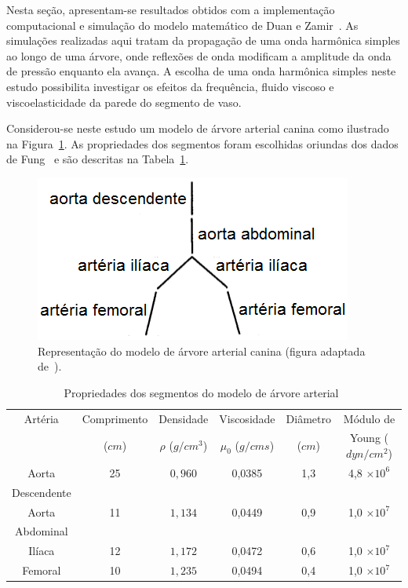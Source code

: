 \documentclass[a4paper,12pt]{monografia}
\theoremstyle{plain}
\theoremstyle{definition}
\theoremstyle{remark}
\begin{document}
Nesta seção, apresentam-se resultados obtidos com a implementação computacional e simulação do modelo matemático de Duan e Zamir~\cite{Duan1992}. As simulações realizadas aqui tratam da propagação de uma onda harmônica simples ao longo de uma árvore, onde reflexões de onda modificam a amplitude da onda de pressão enquanto ela avança. A escolha de uma onda harmônica simples neste estudo possibilita investigar os efeitos da frequência, fluido viscoso e viscoelasticidade da parede do segmento de vaso.

Considerou-se neste estudo um modelo de árvore arterial canina como ilustrado na Figura~\ref{fig:arvore-canina}. As propriedades dos segmentos foram escolhidas oriundas dos dados de Fung~\cite{Fung} e são descritas na Tabela~\ref{tab1:proprerty}. 

\begin{figure}[!htbp]
	\centering
	\includegraphics[scale=0.8]{Figures/tree_canine.png}
	\caption{Representação do modelo de árvore arterial canina (figura adaptada de~\cite{Duan}).}
	\label{fig:arvore-canina}
\end{figure}

\begin{table}[!htbp]
	\caption{Propriedades dos segmentos do modelo de árvore arterial~\cite{Duan,Fung}}
	\centering{}
	\begin{tabular}{|c||c|c|c|c|c|}
		\hline 
		Artéria	& Comprimento & Densidade & Viscosidade  & Diâmetro & Módulo de  \\ 
		& ($cm$) & $\rho$ ($g/cm^3$) & $\mu_0$ ($g/cm s$) & ($cm$) & Young ($dyn/cm^2$) \\ 
		\hline
		\hline 
		Aorta & 25 & $0,960$ & 0,0385 & 1,3 &4,8 $\times 10^6$ \\ 
		Descendente &  & &  & & \\ 
		\hline 
		Aorta & 11 & $1,134$ & 0,0449 & 0,9 & 1,0 $\times 10^7$ \\
		Abdominal &  & &  & &  \\ 
		\hline 
		Ilíaca & 12 & $1,172$ & 0,0472 & 0,6 & 1,0 $\times 10^7$\\ 
		\hline 
		Femoral & 10 & $1,235$ & 0,0494 & 0,4 & 1,0 $\times 10^7$\\ 
		\hline 
	\end{tabular} 
	\label{tab1:proprerty}
\end{table}
\end{document}
